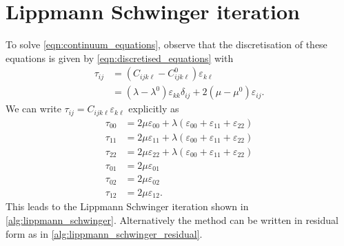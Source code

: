 \documentclass[11pt]{article}
\begin{document}
\section{Lippmann Schwinger iteration}
To solve \eqref{eqn:continuum_equations}, observe that the discretisation of these equations is given by \eqref{eqn:discretised_equations} with
\begin{equation}
    \begin{aligned}
    \tau_{ij} &= (C_{ijk\ell} - C^0_{ijk\ell}) \varepsilon_{k\ell} \\
    &= (\lambda-\lambda^0) \varepsilon_{kk} \delta_{ij} + 2(\mu-\mu^0)\varepsilon_{ij}.
    \end{aligned}
\end{equation}
We can write $\tau_{ij} = C_{ijk\ell}  \varepsilon_{k\ell}$ explicitly as
\begin{equation}
\begin{aligned}
\tau_{00} &= 2\mu\varepsilon_{00} + \lambda\left(\varepsilon_{00}+\varepsilon_{11}+\varepsilon_{22}\right) \\
\tau_{11} &= 2\mu\varepsilon_{11} + \lambda\left(\varepsilon_{00}+\varepsilon_{11}+\varepsilon_{22}\right)\\
\tau_{22} &= 2\mu\varepsilon_{22} + \lambda\left(\varepsilon_{00}+\varepsilon_{11}+\varepsilon_{22}\right)\\
\tau_{01} &= 2\mu\varepsilon_{01}\\
\tau_{02} &= 2\mu\varepsilon_{02}\\
\tau_{12} &= 2\mu\varepsilon_{12}.
\end{aligned}\label{eqn:tau_computation}
\end{equation}
This leads to the Lippmann Schwinger iteration shown in \cref{alg:lippmann_schwinger}. Alternatively the method can be written in residual form as in \cref{alg:lippmann_schwinger_residual}.
\begin{algorithm}
    \caption{Lippmann Schwinger iteration: simplest formulation}
    \label{alg:lippmann_schwinger}
\begin{algorithmic}[1]
    \EndFor
\State{\Return $\varepsilon$}
\end{algorithmic}
\end{algorithm}
\end{document}
